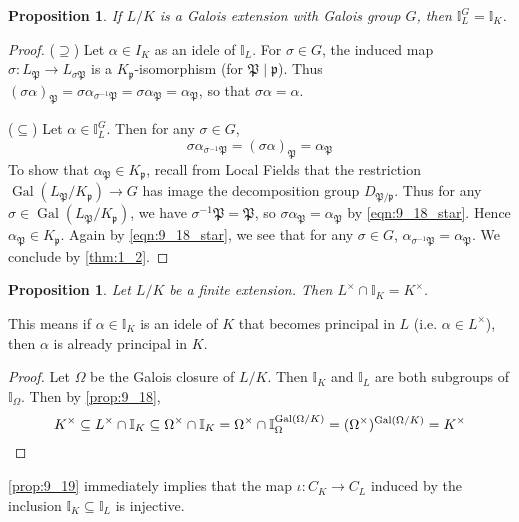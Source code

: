\documentclass[11pt]{article}
\theoremstyle{definition}
\theoremstyle{plain}
\newtheorem{proposition}[definition]{Proposition}
\theoremstyle{remark}
\DeclareMathOperator{\Gal}{Gal}
\newcommand{\II}{\mathbb{I}}
\newcommand{\cp}{\mathfrak{P}}
\newcommand{\fp}{\mathfrak{p}}
\begin{document}
\begin{proposition}\label{prop:9_18}
    If $L/K$ is a Galois extension with Galois group $G$, then $\II_L^G = \II_K$.
\end{proposition}
\begin{proof}
    ($\supseteq$) Let $\alpha \in I_K$ as an idele of $\II_L$. For $\sigma \in G$, the induced map $\sigma : L_\cp \to L_{\sigma \cp}$ is a $K_\fp$-isomorphism (for $\cp \mid \fp$). Thus $(\sigma \alpha)_\cp = \sigma \alpha_{\sigma^{-1} \cp} = \sigma \alpha_\cp = \alpha_\cp$, so that $\sigma \alpha = \alpha$.

    ($\subseteq$) Let $\alpha \in \II_L^G$. Then for any $\sigma \in G$,
    \begin{equation}\label{eqn:9_18_star}
        \sigma \alpha_{\sigma^{-1} \cp} = (\sigma \alpha)_\cp = \alpha_\cp
    \end{equation}
    To show that $\alpha_\cp \in K_\fp$, recall from Local Fields that the restriction $\Gal(L_\cp / K_\fp) \to G$ has image the decomposition group $D_{\cp / \fp}$. Thus for any $\sigma \in \Gal(L_\cp / K_\fp)$, we have $\sigma^{-1}\cp = \cp$, so $\sigma \alpha_\cp = \alpha_\cp$ by \eqref{eqn:9_18_star}. Hence $\alpha_\cp \in K_\fp$. Again by \eqref{eqn:9_18_star}, we see that for any $\sigma \in G$, $\alpha_{\sigma^{-1}\cp} = \alpha_\cp$. We conclude by \autoref{thm:1_2}.
\end{proof}

\begin{proposition}\label{prop:9_19}
    Let $L/K$ be a finite extension. Then $L^\times \cap \II_K = K^\times$.
\end{proposition}
This means if $\alpha \in \II_K$ is an idele of $K$ that becomes principal in $L$ (i.e. $\alpha \in L^\times$), then $\alpha$ is already principal in $K$.
\begin{proof}
    Let $\Omega$ be the Galois closure of $L/K$. Then $\II_K$ and $\II_L$ are both subgroups of $\II_\Omega$. Then by \autoref{prop:9_18},
    \begin{equation*}
        K^\times \subseteq L^\times \cap \II_K \subseteq \Omega^\times \cap \II_K = \Omega^\times \cap \II_\Omega^{\Gal(\Omega / K)} = (\Omega^\times)^{\Gal(\Omega/K)} = K^\times \qedhere
    \end{equation*}
\end{proof}

\autoref{prop:9_19} immediately implies that the map $\iota : C_K \to C_L$ induced by the inclusion $\II_K \subseteq \II_L$ is injective.
\end{document}
